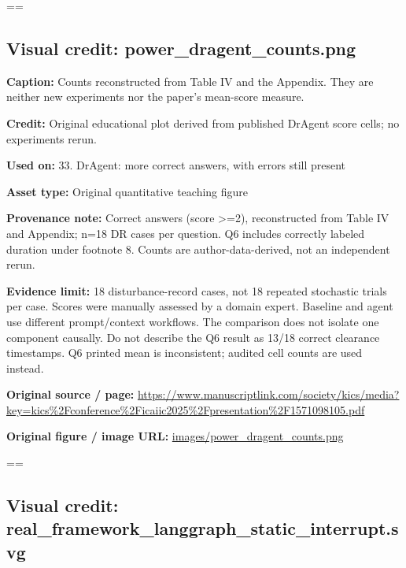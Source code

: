 \documentclass[10pt,letterpaper]{article}
\begin{document}
\setbox\readingEntry=\vbox\bgroup\hsize=\linewidth\subsection*{Visual credit: power\_dragent\_counts.png}
\textbf{Caption:} Counts reconstructed from Table IV and the Appendix. They are neither new experiments nor the paper's mean-score measure.\par
\textbf{Credit:} Original educational plot derived from published DrAgent score cells; no experiments rerun.\par
\textbf{Used on:} 33. DrAgent: more correct answers, with errors still present\par
\textbf{Asset type:} Original quantitative teaching figure\par
\textbf{Provenance note:} Correct answers (score >=2), reconstructed from Table IV and Appendix; n=18 DR cases per question. Q6 includes correctly labeled duration under footnote 8. Counts are author-data-derived, not an independent rerun.\par
\textbf{Evidence limit:} 18 disturbance-record cases, not 18 repeated stochastic trials per case. Scores were manually assessed by a domain expert. Baseline and agent use different prompt/context workflows. The comparison does not isolate one component causally. Do not describe the Q6 result as 13/18 correct clearance timestamps. Q6 printed mean is inconsistent; audited cell counts are used instead.\par
\textbf{Original source / page:} \href{https://www.manuscriptlink.com/society/kics/media?key=kics\%2Fconference\%2Ficaiic2025\%2Fpresentation\%2F1571098105.pdf}{\small\ttfamily https:/\allowbreak{}/\allowbreak{}www.\allowbreak{}manuscriptlink.\allowbreak{}com/\allowbreak{}society/\allowbreak{}kics/\allowbreak{}media?\allowbreak{}key=\allowbreak{}kics\%\allowbreak{}2Fconference\%\allowbreak{}2Ficaiic2025\%\allowbreak{}2Fpresentation\%\allowbreak{}2F1571098105.\allowbreak{}pdf}\par
\textbf{Original figure / image URL:} \href{images/power_dragent_counts.png}{\small\ttfamily images/\allowbreak{}power\_\allowbreak{}dragent\_\allowbreak{}counts.\allowbreak{}png}\par
\egroup\par\noindent\box\readingEntry\par\medskip
\setbox\readingEntry=\vbox\bgroup\hsize=\linewidth\subsection*{Visual credit: real\_framework\_langgraph\_static\_interrupt.svg}
\end{document}
